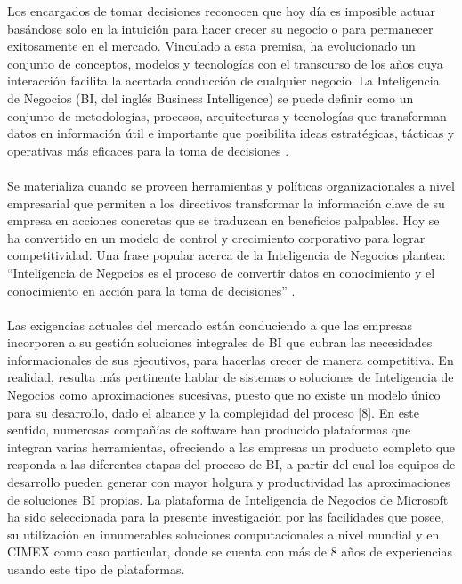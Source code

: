 \documentclass[preprint,12pt]{elsarticle}
\begin{document}
Los encargados de tomar decisiones  reconocen que  hoy día  es imposible  actuar basándose  solo en  la intuición para hacer crecer su negocio o para permanecer exitosamente en el mercado. Vinculado a esta premisa, ha evolucionado un conjunto de conceptos, modelos y tecnologías con el transcurso de los años cuya interacción facilita la acertada conducción de cualquier negocio.  La Inteligencia de Negocios (BI, del inglés Business Intelligence) se puede definir como un conjunto de metodologías,  procesos,  arquitecturas  y  tecnologías  que  transforman  datos  en  información  útil  e importante que posibilita ideas estratégicas, tácticas y operativas más eficaces para la toma de decisiones .\\
\\
Se materializa cuando se proveen herramientas y políticas organizacionales a nivel empresarial que permiten a los directivos transformar la  información clave  de su empresa en acciones concretas que se traduzcan  en  beneficios  palpables.  Hoy  se  ha  convertido  en  un  modelo  de  control  y  crecimiento corporativo para lograr competitividad. Una frase popular acerca de la Inteligencia de Negocios plantea: “Inteligencia de Negocios es el proceso de convertir datos en conocimiento y el conocimiento en acción para la toma de decisiones” .\\
\\
Las  exigencias  actuales del  mercado  están  conduciendo  a que  las  empresas  incorporen  a  su  gestión soluciones integrales de BI que cubran las necesidades informacionales de sus ejecutivos, para hacerlas crecer  de manera  competitiva. En realidad, resulta  más  pertinente hablar  de sistemas  o soluciones  de Inteligencia de Negocios como aproximaciones sucesivas, puesto que no existe un modelo único para su desarrollo, dado el alcance y  la complejidad  del proceso [8]. En este sentido,  numerosas compañías de software  han  producido  plataformas  que  integran  varias  herramientas,  ofreciendo  a  las  empresas  un producto completo que responda a las diferentes etapas del proceso de BI, a partir del cual los equipos de desarrollo  pueden  generar  con  mayor  holgura  y  productividad  las  aproximaciones  de  soluciones  BI propias. La  plataforma de  Inteligencia de  Negocios de Microsoft  ha sido  seleccionada para la presente investigación por las facilidades que posee, su utilización en innumerables soluciones computacionales a nivel mundial  y en  CIMEX como caso  particular, donde se  cuenta con  más de 8  años de  experiencias usando este tipo de plataformas.\\
\end{document}
